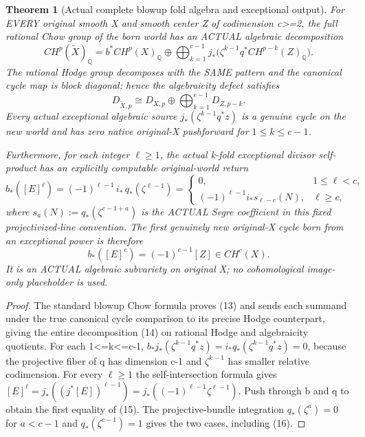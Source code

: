 \documentclass[11pt]{article}
\newtheorem{theorem}{Theorem}[section]
\begin{document}
\begin{theorem}[Actual complete blowup fold algebra and exceptional output]
For EVERY original smooth X and smooth center Z of
codimension c>=2, the full rational Chow group of
the born world has an ACTUAL algebraic decomposition
\[
 \boxed{
 CH^p(\widetilde X)_\mathbb Q
 =b^*CH^p(X)_\mathbb Q
 \oplus\bigoplus_{k=1}^{c-1}
 j_*\big(\zeta^{k-1}q^*CH^{p-k}(Z)_\mathbb Q\big).
 }                                                       \tag{13}
\]
The rational Hodge group decomposes with the SAME
pattern and the canonical cycle map is block diagonal;
hence the algebraicity defect satisfies
\[
 \boxed{
 D_{\widetilde X,p}
 \cong D_{X,p}\oplus
       \bigoplus_{k=1}^{c-1}D_{Z,p-k}.
 }                                                       \tag{14}
\]
Every actual exceptional algebraic source
$j_*(\zeta^{k-1}q^*z)$ is a genuine cycle on the
new world and has zero native original-X pushforward
for $1\le k\le c-1$.

Furthermore, for each integer $\ell\ge1$,
the actual k-fold exceptional divisor self-product
has an explicitly computable original-world return
\[
 \boxed{
 b_*([E]^\ell)
 =(-1)^{\ell-1}\,i_*\,
             q_*(\zeta^{\ell-1})
 =
 \begin{cases}
 0,&1\le\ell<c,\\
 (-1)^{\ell-1}i_*s_{\ell-c}(N),&\ell\ge c,
 \end{cases}
 }                                                       \tag{15}
\]
where $s_a(N):=q_*(\zeta^{c-1+a})$ is the
ACTUAL Segre coefficient in this fixed
projectivized-line convention.
The first genuinely new original-X cycle born from
an exceptional power is therefore
\[
 \boxed{
 b_*([E]^c)=(-1)^{c-1}[Z]\in CH^c(X).
 }                                                       \tag{16}
\]
It is an ACTUAL algebraic subvariety on original X;
no cohomological image-only placeholder is used.
\end{theorem}
\begin{proof}
The standard blowup Chow formula proves (13)
and sends each summand under the true canonical cycle
comparison to its precise Hodge counterpart, giving
the entire decomposition (14) on rational Hodge
and algebraicity quotients.
For each 1<=k<=c-1,
$b_*j_*(\zeta^{k-1}q^*z)=
 i_*q_*(\zeta^{k-1}q^*z)=0$,
because the projective fiber of q has dimension c-1
and $\zeta^{k-1}$ has smaller relative codimension.
For every $\ell\ge1$ the self-intersection
formula gives
$[E]^\ell=j_*((j^*[E])^{\ell-1})
 =j_*((-1)^{\ell-1}\zeta^{\ell-1})$.
Push through b and q to obtain the first
equality of (15). The projective-bundle integration
$q_*(\zeta^a)=0$ for $a<c-1$
and $q_*(\zeta^{c-1})=1$ gives the two cases,
including (16).
\end{proof}
\end{document}
